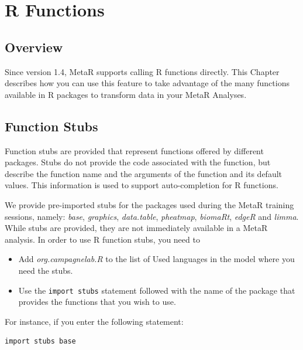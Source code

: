 


\chapter{R Functions}\label{chap:RFunctions}

\section{Overview}
Since version 1.4, MetaR supports calling R functions directly. This Chapter describes how you can use this feature to take advantage of the many functions available in R packages to transform data in your MetaR Analyses. 

\section{Function Stubs}
Function stubs are provided that represent functions offered by different packages. Stubs do not provide the code associated with the function, but describe the function name and the arguments of the function and its default values. This information is used to support auto-completion for R functions. 

We provide pre-imported stubs for the packages used during the MetaR training sessions, namely: \textit{base}, \textit{graphics}, \textit{data.table}, \textit{pheatmap}, \textit{biomaRt}, \textit{edgeR} and \textit{limma}. While stubs are provided, they are not immediately available in a MetaR analysis. In order to use R function stubs, you need to 
\begin{itemize}
  \item Add \textit{org.campagnelab.R} to the list of Used languages in the model where you need the stubs.
  \item Use the \texttt{import stubs} statement followed with the name of the package that provides the functions that you wish to use.
\end{itemize}

\noindent{}For instance, if you enter the following statement: 
\begin{lstlisting}
import stubs base
\end{lstlisting}

